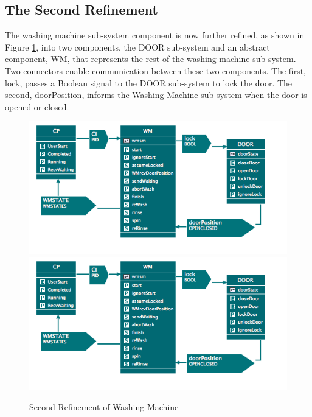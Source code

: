 \subsection{The Second Refinement}
\label{sec:component_diagrams-tutorial_secondRefinement}


The washing machine sub-system component is now further refined, as shown in Figure \ref{fig:SecondRefinementOfWashingMachine}, into two components, the DOOR sub-system and an abstract component, WM, that represents the rest of the washing machine sub-system. Two connectors enable communication between these two components. The first, lock, passes a Boolean signal to the DOOR sub-system to lock the door. The second, doorPosition, informs the Washing Machine sub-system when the door is opened or closed.
 
 \begin{figure}[!htbp]
  \centering
  \ifplastex
  \includegraphics[width=1024]{figures/image25.png}
  \else
  \includegraphics[width=1\textwidth]{figures/image25.png}
  \fi
  \caption{Second Refinement of Washing Machine}
  \label{fig:SecondRefinementOfWashingMachine}
\end{figure} 

